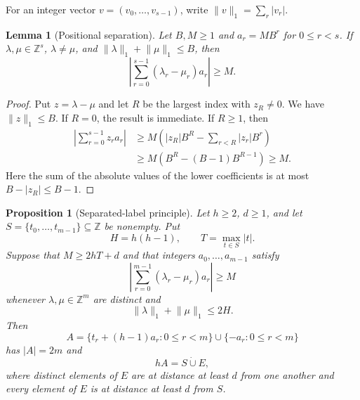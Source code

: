 \documentclass[11pt]{article}
\newtheorem{lemma}{Lemma}
\newtheorem{proposition}{Proposition}
\newcommand{\Z}{\mathbb{Z}}
\begin{document}
For an integer vector $v=(v_0,\ldots,v_{s-1})$, write
$\lVert v\rVert_1=\sum_r |v_r|$.

\begin{lemma}[Positional separation]\label{lem:separation}
Let $B,M\geq 1$ and $a_r=MB^r$ for $0\leq r<s$. If
$\lambda,\mu\in\Z^s$, $\lambda\neq\mu$, and
$\lVert\lambda\rVert_1+\lVert\mu\rVert_1\leq B$, then
\[
 \left|\sum_{r=0}^{s-1}(\lambda_r-\mu_r)a_r\right|\geq M.
\]
\end{lemma}

\begin{proof}
Put $z=\lambda-\mu$ and let $R$ be the largest index with $z_R\neq 0$.
We have $\lVert z\rVert_1\leq B$. If $R=0$, the result is immediate. If
$R\geq 1$, then
\begin{align*}
\left|\sum_{r=0}^{s-1}z_ra_r\right|
&\geq M\left(|z_R|B^R-\sum_{r<R}|z_r|B^r\right)\\
&\geq M\left(B^R-(B-1)B^{R-1}\right)
\geq M.
\end{align*}
Here the sum of the absolute values of the lower coefficients is at most
$B-|z_R|\leq B-1$.
\end{proof}

\begin{proposition}[Separated-label principle]\label{prop:labels}
Let $h\geq 2$, $d\geq 1$, and let
$S=\{t_0,\ldots,t_{m-1}\}\subseteq\Z$ be nonempty. Put
\[
 H=h(h-1),
 \qquad
 T=\max_{t\in S}|t|.
\]
Suppose that $M\geq 2hT+d$ and that integers $a_0,\ldots,a_{m-1}$ satisfy
\[
 \left|\sum_{r=0}^{m-1}(\lambda_r-\mu_r)a_r\right|\geq M
 \tag{1}\label{eq:abstract-separation}
\]
whenever $\lambda,\mu\in\Z^m$ are distinct and
\[
 \lVert\lambda\rVert_1+\lVert\mu\rVert_1\leq 2H.
\]
Then
\[
 A=\{t_r+(h-1)a_r:0\leq r<m\}\cup\{-a_r:0\leq r<m\}
\]
has $|A|=2m$ and
\[
 hA=S\mathbin{\dot\cup}E,
\]
where distinct elements of $E$ are at distance at least $d$ from one another
and every element of $E$ is at distance at least $d$ from $S$.
\end{proposition}
\end{document}
